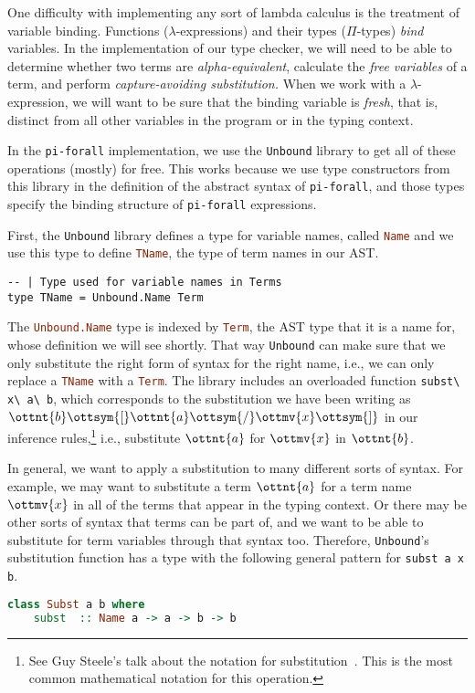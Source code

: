 \documentclass{article}
\newcommand\cd[1]{\lstinline[language=Haskell]{#1}}
\newcommand\pif{\texttt{pi-forall}\xspace}
\newcommand\unbound{\texttt{Unbound}\xspace}
\theoremstyle{definition}
\begin{document}
One difficulty with implementing any sort of lambda calculus is the treatment
of variable binding. Functions ($\lambda$-expressions) and their types
($\Pi$-types) \emph{bind} variables. In the implementation of our type
checker, we will need to be able to determine whether two terms are
\emph{alpha-equivalent}, calculate the \emph{free variables} of a term, and
perform \emph{capture-avoiding substitution.} When we work with a
$\lambda$-expression, we will want to be sure that the binding variable is
\emph{fresh}, that is, distinct from all other variables in the program or in
the typing context.

In the \pif implementation, we use the \unbound library to get all of these
operations (mostly) for free. This works because we use type constructors from
this library in the definition of the abstract syntax of \pif, and those types
specify the binding structure of \pif expressions.

First, the \unbound library defines a type for variable names, called
\cd{Name} and we use this type to define \cd{TName}, the type of term
names in our AST.
%
\begin{verbatim}
-- | Type used for variable names in Terms
type TName = Unbound.Name Term
\end{verbatim}
%
The \cd{Unbound.Name} type is indexed by \cd{Term}, the AST type that it is a
name for, whose definition we will see shortly. That way \unbound can make
sure that we only substitute the right form of syntax for the right name,
i.e., we can only replace a \cd{TName} with a \cd{Term}.  The library
includes an overloaded function \cd{subst\ x\ a\ b}, which corresponds to
the substitution we have been writing as $\ottnt{b}  \ottsym{[}  \ottnt{a}  \ottsym{/}  \ottmv{x}  \ottsym{]}$ in our inference
rules,\footnote{See Guy Steele's talk about the notation for
  substitution~\cite{steele:ppop17}. This is the most common mathematical
  notation for this operation.} i.e., substitute $\ottnt{a}$ for $\ottmv{x}$ in
$\ottnt{b}$.

In general, we want to apply a substitution to many different sorts of
syntax. For example, we may want to substitute a term $\ottnt{a}$ for a term name
$\ottmv{x}$ in all of the terms that appear in the typing context. Or there may be
other sorts of syntax that terms can be part of, and we want to be able to
substitute for term variables through that syntax too. Therefore, \unbound's
substitution function has a type with the following general pattern for
\cd{subst a x b}.
\begin{lstlisting}[language=Haskell]
 class Subst a b where
    subst  :: Name a -> a -> b -> b
\end{lstlisting}
\end{document}
